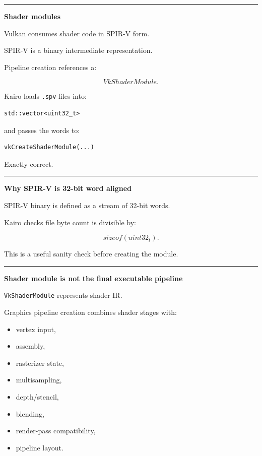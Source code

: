 \begin{center}\rule{0.5\linewidth}{0.5pt}\end{center}

\textbf{Shader modules}

Vulkan consumes shader code in SPIR-V form.

SPIR-V is a binary intermediate representation.

Pipeline creation references a:

\[
VkShaderModule.
\]

Kairo loads \texttt{.spv} files into:

\begin{verbatim}
std::vector<uint32_t>
\end{verbatim}

and passes the words to:

\begin{verbatim}
vkCreateShaderModule(...)
\end{verbatim}

Exactly correct.

\begin{center}\rule{0.5\linewidth}{0.5pt}\end{center}

\textbf{Why SPIR-V is 32-bit word aligned}

SPIR-V binary is defined as a stream of 32-bit words.

Kairo checks file byte count is divisible by:

\[
sizeof(uint32_t).
\]

This is a useful sanity check before creating the module.

\begin{center}\rule{0.5\linewidth}{0.5pt}\end{center}

\textbf{Shader module is not the final executable pipeline}

\texttt{VkShaderModule} represents shader IR.

Graphics pipeline creation combines shader stages with:

\begin{itemize}
\tightlist
\item
  vertex input,
\item
  assembly,
\item
  rasterizer state,
\item
  multisampling,
\item
  depth/stencil,
\item
  blending,
\item
  render-pass compatibility,
\item
  pipeline layout.
\end{itemize}

